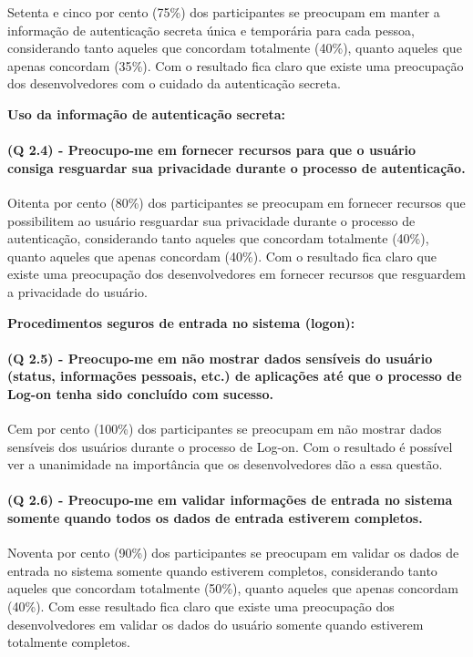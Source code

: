 Setenta e cinco por cento (75{\%}) dos participantes se preocupam em manter a informação de autenticação secreta única e temporária para cada pessoa, considerando tanto aqueles que concordam totalmente (40{\%}), quanto aqueles que apenas concordam (35{\%}). Com o resultado fica claro que existe uma preocupação dos desenvolvedores com o cuidado da autenticação secreta.

\vspace{0.5cm}
\noindent\textbf{Uso da informação de autenticação secreta:}
\paragraph{\textbf{(Q 2.4)} - Preocupo-me em fornecer recursos para que o usuário consiga resguardar sua privacidade durante o processo de autenticação.}

Oitenta por cento (80{\%}) dos participantes se preocupam em fornecer recursos que possibilitem ao usuário resguardar sua privacidade durante o processo de autenticação, considerando tanto aqueles que concordam totalmente (40{\%}), quanto aqueles que apenas concordam (40{\%}). Com o resultado fica claro que existe uma preocupação dos desenvolvedores em fornecer recursos que resguardem a privacidade do usuário.

\vspace{5cm}
\noindent\textbf{Procedimentos seguros de entrada no sistema (logon):}

\paragraph{\textbf{(Q 2.5)} - Preocupo-me em não mostrar dados sensíveis do usuário (status, informações pessoais, etc.) de aplicações até que o processo de Log-on tenha sido concluído com sucesso.}

Cem por cento (100{\%}) dos participantes se preocupam em não mostrar dados sensíveis dos usuários durante o processo de Log-on. Com o resultado é possível ver a unanimidade na importância que os desenvolvedores dão a essa questão.

\paragraph{\textbf{(Q 2.6)} - Preocupo-me em validar informações de entrada no sistema somente quando todos os dados de entrada estiverem completos.}

Noventa por cento (90{\%}) dos participantes se preocupam em validar os dados de entrada no sistema somente quando estiverem completos, considerando tanto aqueles que concordam totalmente (50{\%}), quanto aqueles que apenas concordam (40{\%}). Com esse resultado fica claro que existe uma preocupação dos desenvolvedores em validar os dados do usuário somente quando estiverem totalmente completos.

